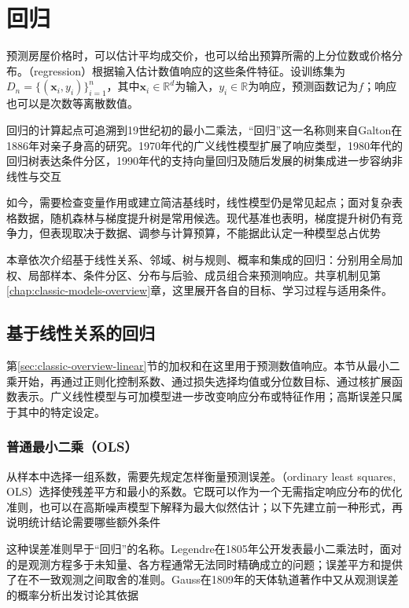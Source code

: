\chapter{回归}
\label{chap:regression}

预测房屋价格时，可以估计平均成交价，也可以给出预算所需的上分位数或价格分布。（regression）根据输入估计数值响应的这些条件特征。设训练集为$D_n=\{(\bm{x}_i,y_i)\}_{i=1}^{n}$，其中$\bm{x}_i\in\mathbb{R}^{d}$为输入，$y_i\in\mathbb{R}$为响应，预测函数记为$f$；响应也可以是次数等离散数值。

回归的计算起点可追溯到19世纪初的最小二乘法，“回归”这一名称则来自Galton在1886年对亲子身高的研究。1970年代的广义线性模型扩展了响应类型，1980年代的回归树表达条件分区，1990年代的支持向量回归及随后发展的树集成进一步容纳非线性与交互

如今，需要检查变量作用或建立简洁基线时，线性模型仍是常见起点；面对复杂表格数据，随机森林与梯度提升树是常用候选。现代基准也表明，梯度提升树仍有竞争力，但表现取决于数据、调参与计算预算，不能据此认定一种模型总占优势

本章依次介绍基于线性关系、邻域、树与规则、概率和集成的回归：分别用全局加权、局部样本、条件分区、分布与后验、成员组合来预测响应。共享机制见第\ref{chap:classic-models-overview}章，这里展开各自的目标、学习过程与适用条件。

\section{基于线性关系的回归}
\label{sec:regression-linear}

第\ref{sec:classic-overview-linear}节的加权和在这里用于预测数值响应。本节从最小二乘开始，再通过正则化控制系数、通过损失选择均值或分位数目标、通过核扩展函数表示。广义线性模型与可加模型进一步改变响应分布或特征作用；高斯误差只属于其中的特定设定。

\subsection{普通最小二乘（OLS）}
\label{sec:regression-ols}

从样本中选择一组系数，需要先规定怎样衡量预测误差。（ordinary least squares, OLS）选择使残差平方和最小的系数。它既可以作为一个无需指定响应分布的优化准则，也可以在高斯噪声模型下解释为最大似然估计；以下先建立前一种形式，再说明统计结论需要哪些额外条件

这种误差准则早于“回归”的名称。Legendre在1805年公开发表最小二乘法时，面对的是观测方程多于未知量、各方程通常无法同时精确成立的问题；误差平方和提供了在不一致观测之间取舍的准则。Gauss在1809年的天体轨道著作中又从观测误差的概率分析出发讨论其依据

